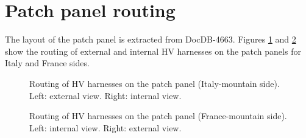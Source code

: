 
\clearpage
\section{Patch panel routing}

The layout of the patch panel is extracted from DocDB-4663.
Figures \ref{fig:calohv:pp:0} and \ref{fig:calohv:pp:1}
show the routing of external and internal HV harnesses
on the patch panels for Italy and France sides.

\begin{figure}[h!]
  \begin{center}
    \scalebox{0.5}{}
  \end{center}
  \caption{Routing of HV harnesses on the patch panel (Italy-mountain side). Left: external view. Right: internal view.}
  \label{fig:calohv:pp:0}
\end{figure}

\begin{figure}[h!]
  \begin{center}
    \scalebox{0.5}{}
  \end{center}
  \caption{Routing of HV harnesses on the patch panel (France-mountain side). Left: internal view. Right: external view.}
  \label{fig:calohv:pp:1}
\end{figure}

